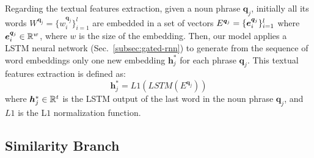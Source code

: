 Regarding the textual features extraction, given a noun phrase
$\bm{q}_j$, initially all its words $W^{\bm{q}_j} = \{ w^{\bm{q}_j}_i
\}^l_{i=1}$ are embedded in a set of vectors $E^{\bm{q}_j} = \{ \bm{e}^{\bm{q}_j}_i
\}^l_{i=1}$ where $\bm{e}^{\bm{q}_j}_i \in \mathbb{R}^w$, where $w$ is the size of the
embedding. Then, our model applies a LSTM neural network
(Sec.~\ref{subsec:gated-rnn}) to generate from the sequence of word
embeddings only one new embedding $\bm{h}^*_j$ for each phrase
$\bm{q}_j$. This textual features extraction is defined as:
\begin{equation}
  \bm{h}^*_j = L1(LSTM(E^{\bm{q}_j}))
  \label{eq:h-star}
\end{equation}
where $\bm{h}^*_j \in \mathbb{R}^t$ is the LSTM output of the last word in
the noun phrase $\bm{q}_j$, and $L1$ is the L$1$ normalization
function.

\subsection{Similarity Branch}
\label{subsec:similarity-branch}

